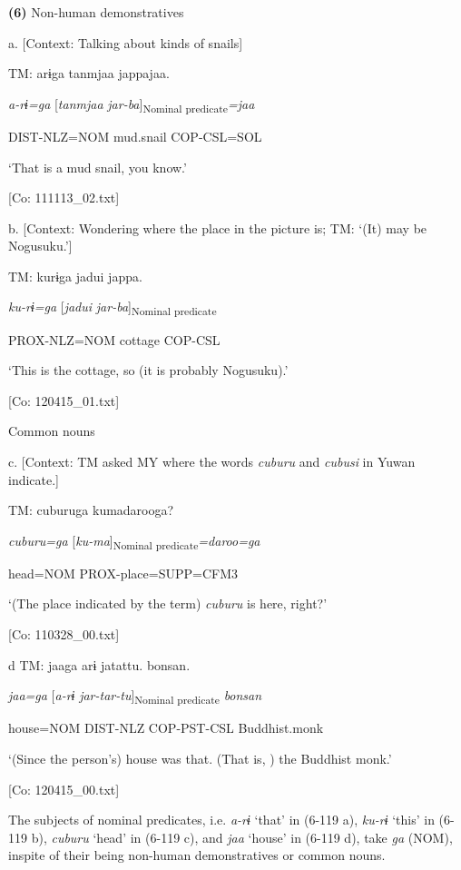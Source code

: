 \textbf{(6)}  Non-human demonstratives

  a.  [Context: Talking about kinds of snails]

    TM:  arɨga  tanmjaa  jappajaa.

      \textit{a-rɨ=ga}  [\textit{tanmjaa}  \textit{jar-ba}]\textsubscript{Nominal predicate}\textit{=jaa}

      DIST-NLZ=NOM  mud.snail  COP-CSL=SOL

      ‘That is a mud snail, you know.’

      [Co: 111113\_02.txt]

  b.  [Context: Wondering where the place in the picture is; TM: ‘(It) may be Nogusuku.’]

    TM:  kurɨga  jadui  jappa.

      \textit{ku-rɨ=ga}  [\textit{jadui}  \textit{jar-ba}]\textsubscript{Nominal predicate}

      PROX-NLZ=NOM  cottage  COP-CSL

      ‘This is the cottage, so (it is probably Nogusuku).’

      [Co: 120415\_01.txt]

  Common nouns

  c.  [Context: TM asked MY where the words \textit{cuburu} and \textit{cubusi} in Yuwan indicate.]

    TM:  cuburuga  kumadarooga?

      \textit{cuburu=ga}  [\textit{ku-ma}]\textsubscript{Nominal predicate}\textit{=daroo=ga}

      head=NOM  PROX-place=SUPP=CFM3

      ‘(The place indicated by the term) \textit{cuburu} is here, right?’

      [Co: 110328\_00.txt]

  d  TM:  jaaga  arɨ  jatattu.  bonsan.

      \textit{jaa=ga}  [\textit{a-rɨ}  \textit{jar-tar-tu}]\textsubscript{Nominal predicate}  \textit{bonsan}

      house=NOM  DIST-NLZ  COP-PST-CSL  Buddhist.monk

      ‘(Since the person’s) house was that. (That is, ) the Buddhist monk.’

      [Co: 120415\_00.txt]

The subjects of nominal predicates, i.e. \textit{a-rɨ} ‘that’ in (6-119 a), \textit{ku-rɨ} ‘this’ in (6-119 b), \textit{cuburu} ‘head’ in (6-119 c), and \textit{jaa} ‘house’ in (6-119 d), take \textit{ga} (NOM), inspite of their being non-human demonstratives or common nouns.

